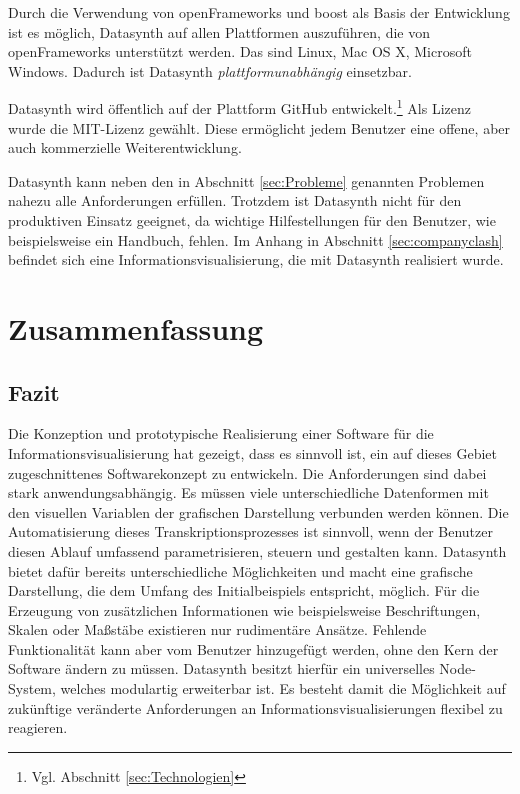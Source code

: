 \documentclass[a4paper, 
               12pt,
               DIV=calc,
               version=first,
               pdftex,
               headsepline,
               footsepline,
               bibliography=totocnumbered,
               listof=numbered]{scrreprt}
\begin{document}
Durch die Verwendung von openFrameworks und boost als Basis der Entwicklung
ist es möglich, Datasynth auf allen Plattformen auszuführen, die von openFrameworks
unterstützt werden. Das sind Linux, Mac OS X, Microsoft Windows.
Dadurch ist Datasynth \textit{plattformunabhängig} einsetzbar.

Datasynth wird öffentlich auf der Plattform GitHub entwickelt.\footnote{Vgl.
Abschnitt \ref{sec:Technologien}} Als Lizenz wurde die MIT-Lizenz gewählt.
Diese ermöglicht jedem Benutzer eine offene, aber auch kommerzielle Weiterentwicklung.

Datasynth kann neben den in Abschnitt \ref{sec:Probleme} genannten Problemen nahezu alle Anforderungen erfüllen.
Trotzdem ist Datasynth nicht für den produktiven Einsatz geeignet, da wichtige Hilfestellungen für den
Benutzer, wie beispielsweise ein Handbuch, fehlen. Im Anhang in Abschnitt
\ref{sec:companyclash} befindet sich eine Informationsvisualisierung, die mit
Datasynth realisiert wurde.

\chapter{Zusammenfassung}
\label{cha:Zusammenfassung}
\section{Fazit}
\label{sec:Fazit}
Die Konzeption und prototypische Realisierung einer Software für die
Informationsvisualisierung hat gezeigt, dass es sinnvoll ist,
ein auf dieses Gebiet zugeschnittenes Softwarekonzept zu entwickeln.
Die Anforderungen sind dabei stark
anwendungsabhängig. Es müssen viele unterschiedliche Datenformen
mit den visuellen Variablen der grafischen Darstellung verbunden werden können.
Die Automatisierung dieses Transkriptionsprozesses ist sinnvoll,
wenn der Benutzer diesen Ablauf umfassend parametrisieren, steuern und gestalten kann.
Datasynth bietet dafür bereits unterschiedliche Möglichkeiten und
macht eine grafische Darstellung, die dem Umfang des Initialbeispiels
entspricht, möglich. Für die Erzeugung von zusätzlichen Informationen
wie beispielsweise Beschriftungen, Skalen oder
Maßstäbe existieren nur rudimentäre Ansätze.
Fehlende Funktionalität kann aber vom Benutzer hinzugefügt werden, ohne
den Kern der Software ändern zu müssen. Datasynth besitzt hierfür ein universelles
Node-System, welches modulartig erweiterbar ist. Es besteht
damit die Möglichkeit auf zukünftige veränderte Anforderungen an
Informationsvisualisierungen flexibel zu reagieren.
\end{document}
